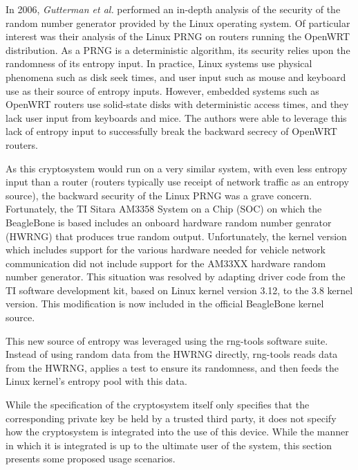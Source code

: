 In 2006, \emph{Gutterman et al.} \cite{Gutterman2006} performed an in-depth analysis of the security of the random number generator provided by the Linux operating system. 
Of particular interest was their analysis of the Linux PRNG on routers running the OpenWRT distribution. As a PRNG is a deterministic algorithm, its security 
relies upon the randomness of its entropy input. In practice, Linux systems use physical phenomena such as disk seek times, and user input
such as mouse and keyboard use as their source of entropy inputs. However, embedded systems such as OpenWRT routers use solid-state disks
with deterministic access times, and they lack user input from keyboards and mice. The authors were able to leverage this lack of entropy
input to successfully break the backward secrecy of OpenWRT routers.

As this cryptosystem would run on a very similar system, with even less entropy input than a router (routers typically use receipt of network
traffic as an entropy source), the backward security of the Linux PRNG was a grave concern. Fortunately, the TI Sitara AM3358 System on a Chip (SOC)
on which the BeagleBone is based includes an onboard hardware random number genrator (HWRNG) that produces true random output. Unfortunately, the
kernel version which includes support for the various hardware needed for vehicle network communication did not include support for the AM33XX
hardware random number generator. This situation was resolved by adapting driver code from the TI software development kit, based on Linux
kernel version 3.12, to the 3.8 kernel version. This modification is now included in the official BeagleBone kernel source.

This new source of entropy was leveraged using the rng-tools software suite. Instead of using random data from the HWRNG directly, rng-tools
reads data from the HWRNG, applies a test to ensure its randomness, and then feeds the Linux kernel's entropy pool with this data.


While the specification of the cryptosystem itself only specifies that the corresponding private key be held by a trusted third party, it does
not specify how the cryptosystem is integrated into the use of this device. While the manner in which it is integrated is up to the ultimate
user of the system, this section presents some proposed usage scenarios.


